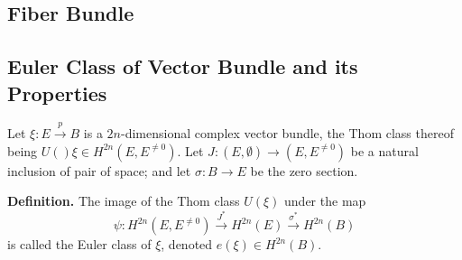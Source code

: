 \documentclass[10pt]{article}
\begin{document}
\subsection{Fiber Bundle}
\subsection{Euler Class of Vector Bundle and its Properties}

Let $\xi:E\overset{p}{\to}B$ is a $2n$-dimensional complex vector bundle, the Thom class thereof being $U()\xi\in H^{2n}(E,E^{\neq0})$. Let $J:(E,\emptyset)\to(E,E^{\neq0})$ be a natural inclusion of pair of space; and let $\sigma:B\to E$ be the zero section.

\textbf{Definition.} The image of the Thom class $U(\xi)$ under the map
$$\psi:H^{2n}(E,E^{\neq0})\overset{J^*}{\to}H^{2n}(E)\overset{\sigma^*}{\to}H^{2n}(B)$$
is called the Euler class of $\xi$, denoted $e(\xi)\in H^{2n}(B)$.
\end{document}
